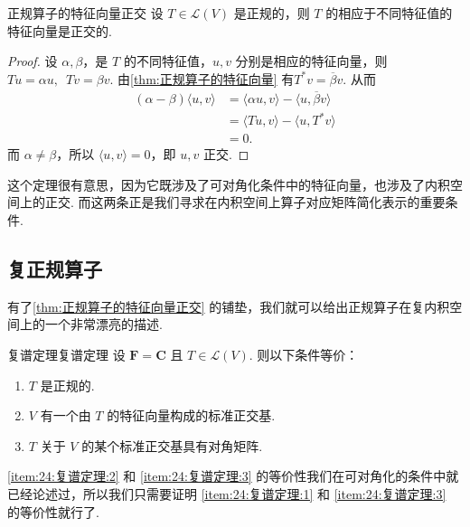 \begin{theorem}{}{正规算子的特征向量正交}
    设 $ T \in \mathcal{L}(V) $ 是正规的，则 $ T $ 的相应于不同特征值的特征向量是正交的.
\end{theorem}

\begin{proof}
    设 $ \alpha, \beta $，是 $ T $ 的不同特征值，$ u, v $ 分别是相应的特征向量，则 $ Tu = \alpha u,\enspace Tv = \beta v $. 由\autoref{thm:正规算子的特征向量} 有$ T^*v = \overline{\beta} v $. 从而
    \begin{align*}
        (\alpha - \beta)\langle u, v \rangle
         & = \langle \alpha u, v \rangle - \langle u, \overline{\beta}v \rangle \\
         & = \langle Tu, v \rangle - \langle u, T^*v \rangle                    \\
         & = 0.
    \end{align*}
    而 $ \alpha \neq \beta $，所以 $ \langle u, v \rangle = 0 $，即 $ u, v $ 正交.
\end{proof}

这个定理很有意思，因为它既涉及了可对角化条件中的特征向量，也涉及了内积空间上的正交. 而这两条正是我们寻求在内积空间上算子对应矩阵简化表示的重要条件.

\subsection{复正规算子}

有了\autoref{thm:正规算子的特征向量正交} 的铺垫，我们就可以给出正规算子在复内积空间上的一个非常漂亮的描述.

\begin{theorem}{复谱定理}{复谱定理} 
    设 $ \mathbf{F} = \mathbf{C} $ 且 $ T \in \mathcal{L}(V) $. 则以下条件等价：
    \begin{enumerate}
        \item \label{item:24:复谱定理:1}
              $ T $ 是正规的.

        \item \label{item:24:复谱定理:2}
              $ V $ 有一个由 $ T $ 的特征向量构成的标准正交基.

        \item \label{item:24:复谱定理:3}
              $ T $ 关于 $ V $ 的某个标准正交基具有对角矩阵.
    \end{enumerate}
\end{theorem}

\ref*{item:24:复谱定理:2} 和 \ref*{item:24:复谱定理:3} 的等价性我们在可对角化的条件中就已经论述过，所以我们只需要证明 \ref*{item:24:复谱定理:1} 和 \ref*{item:24:复谱定理:3} 的等价性就行了.

